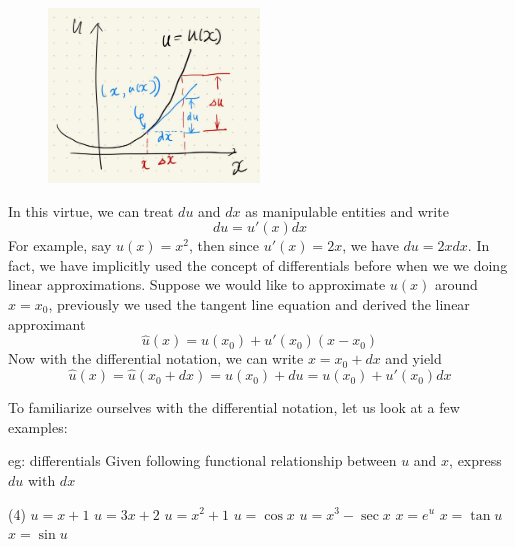 \begin{figure}[ht]
    \centering
    \includegraphics[width = 0.5\textwidth]{figures/chap 06/Differential.png}
\end{figure}

In this virtue, we can treat $du$ and $dx$ as manipulable entities and write
\[du = u'(x)dx\]
For example, say $u(x) = x^2$, then since $u'(x) = 2x$, we have $du = 2xdx$.  In fact, we have implicitly used the concept of differentials before when we we doing linear approximations.  Suppose we would like to approximate $u(x)$ around $x = x_0$, previously we used the tangent line equation and derived the linear approximant
\[\hat{u}(x) = u(x_0) + u'(x_0) (x - x_0)\]
Now with the differential notation, we can write $x = x_0 + dx$ and yield
\[\hat{u}(x) = \hat{u}(x_0 + dx) = u(x_0) + du = u(x_0) + u'(x_0)dx\]

To familiarize ourselves with the differential notation, let us look at a few examples:
\begin{eg}[]{eg: differentials}
    Given following functional relationship between $u$ and $x$, express $du$ with $dx$
    \begin{tasks}(4)
        \task $u = x + 1$
        \task $u = 3x + 2$
        \task $u = x^2 + 1$
        \task $u = \cos x$
        \task $u = x^3 - \sec x$
        \task $x = e^u$
        \task $x = \tan u$
        \task $x = \sin u$
    \end{tasks}
\end{eg}

